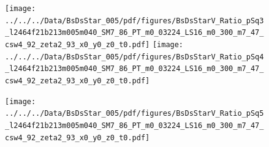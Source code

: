 \documentclass[a4paper,10pt]{article}
\begin{document}
\clearpage
\begin{figure}[p]
 \texttt{[image: ../../../Data/BsDsStar\_005/pdf/figures/BsDsStarV\_Ratio\_pSq3\_l2464f21b213m005m040\_SM7\_86\_PT\_m0\_03224\_LS16\_m0\_300\_m7\_47\_csw4\_92\_zeta2\_93\_x0\_y0\_z0\_t0.pdf]} 
 \texttt{[image: ../../../Data/BsDsStar\_005/pdf/figures/BsDsStarV\_Ratio\_pSq4\_l2464f21b213m005m040\_SM7\_86\_PT\_m0\_03224\_LS16\_m0\_300\_m7\_47\_csw4\_92\_zeta2\_93\_x0\_y0\_z0\_t0.pdf]} 
 \end{figure}
\begin{figure}[p]
 \texttt{[image: ../../../Data/BsDsStar\_005/pdf/figures/BsDsStarV\_Ratio\_pSq5\_l2464f21b213m005m040\_SM7\_86\_PT\_m0\_03224\_LS16\_m0\_300\_m7\_47\_csw4\_92\_zeta2\_93\_x0\_y0\_z0\_t0.pdf]} 
 \end{figure}
\clearpage
\end{document}

